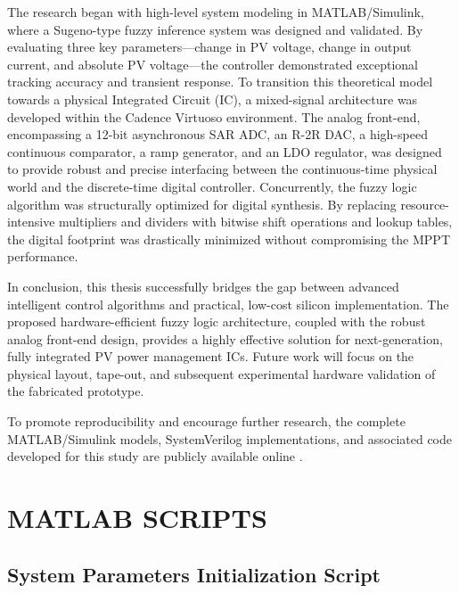 \documentclass[a4paper,oneside,12pt]{report}
\numberwithin{equation}{chapter}
\begin{document}
The research began with high-level system modeling in MATLAB/Simulink, where a Sugeno-type fuzzy inference system was designed and validated. By evaluating three key parameters—change in PV voltage, change in output current, and absolute PV voltage—the controller demonstrated exceptional tracking accuracy and transient response. To transition this theoretical model towards a physical Integrated Circuit (IC), a mixed-signal architecture was developed within the Cadence Virtuoso environment. The analog front-end, encompassing a 12-bit asynchronous SAR ADC, an R-2R DAC, a high-speed continuous comparator, a ramp generator, and an LDO regulator, was designed to provide robust and precise interfacing between the continuous-time physical world and the discrete-time digital controller. Concurrently, the fuzzy logic algorithm was structurally optimized for digital synthesis. By replacing resource-intensive multipliers and dividers with bitwise shift operations and lookup tables, the digital footprint was drastically minimized without compromising the MPPT performance.

In conclusion, this thesis successfully bridges the gap between advanced intelligent control algorithms and practical, low-cost silicon implementation. The proposed hardware-efficient fuzzy logic architecture, coupled with the robust analog front-end design, provides a highly effective solution for next-generation, fully integrated PV power management ICs. Future work will focus on the physical layout, tape-out, and subsequent experimental hardware validation of the fabricated prototype.

To promote reproducibility and encourage further research, the complete MATLAB/Simulink models, SystemVerilog implementations, and associated code developed for this study are publicly available online \cite{GithubRepo}.

\nocite{*}



\appendix
\chapter{MATLAB SCRIPTS}\label{app:matlab}

\section{System Parameters Initialization Script}

\end{document}
